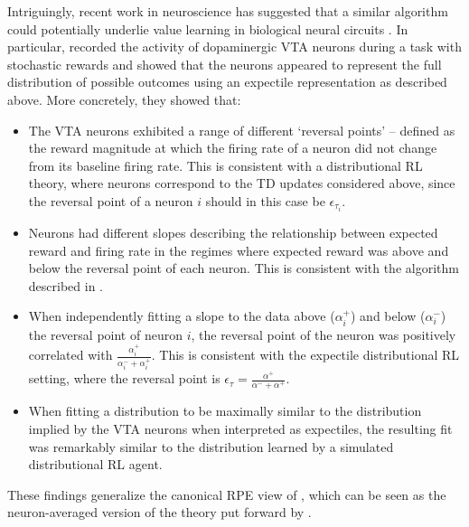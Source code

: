 Intriguingly, recent work in neuroscience has suggested that a similar algorithm could potentially underlie value learning in biological neural circuits \citep{dabney2020distributional,lowet2020distributional}.
In particular, \citet{dabney2020distributional} recorded the activity of dopaminergic VTA neurons during a task with stochastic rewards and showed that the neurons appeared to represent the full distribution of possible outcomes using an expectile representation as described above.
More concretely, they showed that:
\begin{itemize}
    \item The VTA neurons exhibited a range of different `reversal points' -- defined as the reward magnitude at which the firing rate of a neuron did not change from its baseline firing rate.
    This is consistent with a distributional RL theory, where neurons correspond to the TD updates considered above, since the reversal point of a neuron $i$ should in this case be $\epsilon_{\tau_i}$.
    \item Neurons had different slopes describing the relationship between expected reward and firing rate in the regimes where expected reward was above and below the reversal point of each neuron.
    This is consistent with the algorithm described in .
    \item When independently fitting a slope to the data above ($\alpha_i^+$) and below ($\alpha_i^-$) the reversal point of neuron $i$, the reversal point of the neuron was positively correlated with $\frac{\alpha_i^{+}}{\alpha_i^- + \alpha_i^+}$.
    This is consistent with the expectile distributional RL setting, where the reversal point is $\epsilon_\tau = \frac{\alpha^{+}}{\alpha^- + \alpha^+}$.
    \item When fitting a distribution to be maximally similar to the distribution implied by the VTA neurons when interpreted as expectiles, the resulting fit was remarkably similar to the distribution learned by a simulated distributional RL agent.
\end{itemize}
These findings generalize the canonical RPE view of \citet{schultz1997neural}, which can be seen as the neuron-averaged version of the theory put forward by \citet{dabney2020distributional}.

